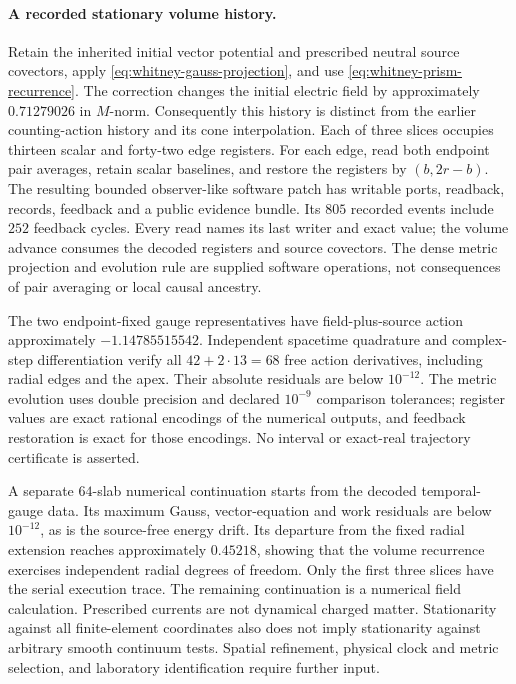 \paragraph{A recorded stationary volume history.}
Retain the inherited initial vector potential and prescribed neutral source
covectors, apply \eqref{eq:whitney-gauss-projection}, and use
\eqref{eq:whitney-prism-recurrence}. The correction changes the initial
electric field by approximately \(0.71279026\) in \(M\)-norm.
Consequently this history is distinct from the earlier counting-action
history and its cone interpolation. Each of three slices occupies thirteen
scalar and forty-two edge registers. For each edge, read both endpoint
pair averages, retain scalar baselines, and restore the registers by
\((b,2r-b)\). The resulting bounded observer-like software patch has
writable ports, readback, records, feedback and a public evidence bundle.
Its \(805\) recorded events include \(252\) feedback cycles. Every
read names its last writer and exact value; the volume advance consumes
the decoded registers and source covectors. The dense metric projection
and evolution rule are supplied software operations, not consequences of
pair averaging or local causal ancestry.

The two endpoint-fixed gauge representatives have field-plus-source action
approximately \(-1.14785515542\). Independent spacetime quadrature and
complex-step differentiation verify all \(42+2\cdot13=68\) free action
derivatives, including radial edges and the apex. Their absolute residuals
are below \(10^{-12}\). The metric evolution uses double precision and
declared \(10^{-9}\) comparison tolerances; register values are exact
rational encodings of the numerical outputs, and feedback restoration is
exact for those encodings. No interval or exact-real trajectory certificate
is asserted.

A separate \(64\)-slab numerical continuation starts from the decoded
temporal-gauge data. Its maximum Gauss, vector-equation and work residuals
are below \(10^{-12}\), as is the source-free energy drift. Its departure
from the fixed radial extension reaches approximately \(0.45218\),
showing that the volume recurrence exercises independent radial degrees
of freedom. Only the first three slices have the serial execution trace.
The remaining continuation is a numerical field calculation.
Prescribed currents are not dynamical charged matter. Stationarity against
all finite-element coordinates also does not imply stationarity against
arbitrary smooth continuum tests. Spatial refinement, physical clock and
metric selection, and laboratory identification require further input.


